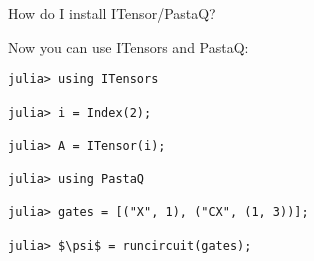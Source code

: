 \begin{frame}[fragile]{How do I install ITensor/PastaQ?}

Now you can use ITensors and PastaQ:
\begin{lstlisting}[language=JuliaLocal, numbers=none, style=julia, basicstyle=\small]
julia> using ITensors

julia> i = Index(2);

julia> A = ITensor(i);

julia> using PastaQ

julia> gates = [("X", 1), ("CX", (1, 3))];

julia> $\psi$ = runcircuit(gates);
\end{lstlisting}

\end{frame}
